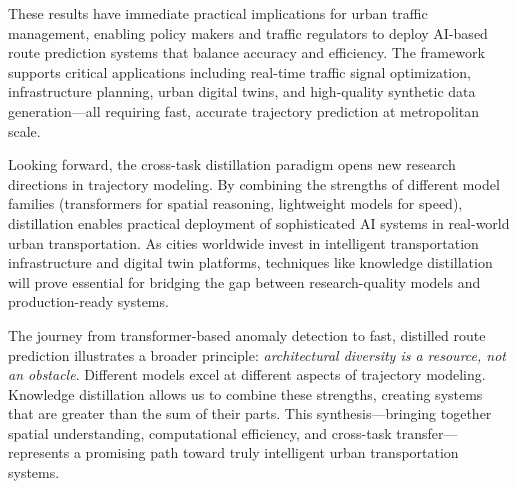 These results have immediate practical implications for urban traffic management, enabling policy makers and traffic regulators to deploy AI-based route prediction systems that balance accuracy and efficiency. The framework supports critical applications including real-time traffic signal optimization, infrastructure planning, urban digital twins, and high-quality synthetic data generation—all requiring fast, accurate trajectory prediction at metropolitan scale.

Looking forward, the cross-task distillation paradigm opens new research directions in trajectory modeling. By combining the strengths of different model families (transformers for spatial reasoning, lightweight models for speed), distillation enables practical deployment of sophisticated AI systems in real-world urban transportation. As cities worldwide invest in intelligent transportation infrastructure and digital twin platforms, techniques like knowledge distillation will prove essential for bridging the gap between research-quality models and production-ready systems.

The journey from transformer-based anomaly detection to fast, distilled route prediction illustrates a broader principle: \emph{architectural diversity is a resource, not an obstacle}. Different models excel at different aspects of trajectory modeling. Knowledge distillation allows us to combine these strengths, creating systems that are greater than the sum of their parts. This synthesis—bringing together spatial understanding, computational efficiency, and cross-task transfer—represents a promising path toward truly intelligent urban transportation systems.

